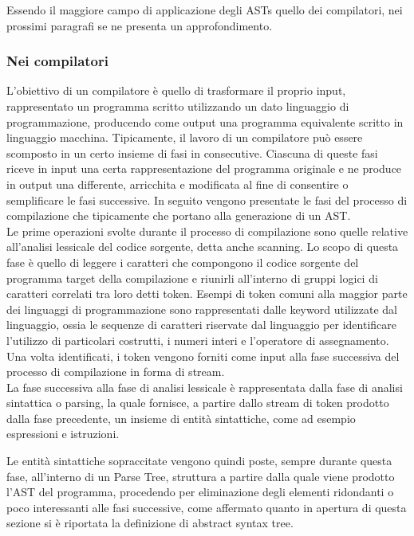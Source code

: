 Essendo il maggiore campo di applicazione degli ASTs quello dei compilatori, nei
prossimi paragrafi se ne presenta un approfondimento.

\subsubsection{Nei compilatori}

L'obiettivo di un compilatore è quello di trasformare il proprio input,
rappresentato un programma scritto utilizzando un dato linguaggio di
programmazione, producendo come output una programma equivalente scritto in
linguaggio macchina. Tipicamente, il lavoro di un compilatore può essere
scomposto in un certo insieme di fasi in consecutive. Ciascuna di queste fasi
riceve in input una certa rappresentazione del programma originale e ne produce
in output una differente, arricchita e modificata al fine di consentire o
semplificare le fasi successive. In seguito vengono presentate le fasi del
processo di compilazione che tipicamente che portano alla generazione di un
AST.\\

Le prime operazioni svolte durante il processo di compilazione sono quelle
relative all’analisi lessicale del codice sorgente, detta anche scanning. Lo
scopo di questa fase è quello di leggere i caratteri che compongono il codice
sorgente del programma target della compilazione e riunirli all’interno di
gruppi logici di caratteri correlati tra loro detti token. Esempi di token
comuni alla maggior parte dei linguaggi di programmazione sono rappresentati
dalle keyword utilizzate dal linguaggio, ossia le sequenze di caratteri
riservate dal linguaggio per identificare l'utilizzo di particolari costrutti, i
numeri interi e l’operatore di assegnamento. Una volta identificati, i token
vengono forniti come input alla fase successiva del processo di compilazione in
forma di stream.\\

La fase successiva alla fase di analisi lessicale è rappresentata dalla fase di
analisi sintattica o parsing, la quale fornisce, a partire dallo stream di token
prodotto dalla fase precedente, un insieme di entità sintattiche, come ad
esempio espressioni e istruzioni.

Le entità sintattiche sopraccitate vengono quindi poste, sempre durante questa
fase, all’interno di un Parse Tree, struttura a partire dalla quale viene
prodotto l’AST del programma, procedendo per eliminazione degli elementi
ridondanti o poco interessanti alle fasi successive, come affermato quanto in
apertura di questa sezione si è riportata la definizione di abstract syntax
tree.

